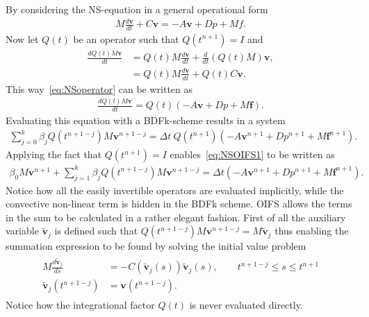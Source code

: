 By considering the NS-equation in a general operational form 
%
\begin{align}
    M\frac{d \mathbf{v}}{dt} + C\mathbf{v} = -A\mathbf{v} +D p +Mf.
    \label{eq:NSoperator}
\end{align}
%
Now let $Q(t)$ be an operator such that $Q(t^{n+1}) = I$ and 
%
\begin{align}
    \frac{dQ(t)M\mathbf{v}}{dt} &=  Q(t)M\frac{d\mathbf{v}}{dt} + \frac{d}{dt}(Q(t)M)\mathbf{v},\\
    &= Q(t)M\frac{d\mathbf{v}}{dt} + Q(t)C\mathbf{v}. 
    \label{eq:integrationalfactor}
\end{align}
%
This way~\ref{eq:NSoperator} can be written as 
\begin{align}
    \frac{d Q(t)M\mathbf{v}}{dt} =Q(t)( -A\mathbf{v} +D p +M\mathbf{f}).
    \label{eq:NSoperatorOIFS}
\end{align}
Evaluating this equation with a BDFk-scheme results in a system 
\begin{align}
    \sum_{j=0}^{k}\beta_jQ(t^{n+1-j})M\mathbf{v}^{n+1-j} =\Delta t \: Q(t^{n+1})( -A\mathbf{v}^{n+1} +D p^{n+1} +M\mathbf{f}^{n+1}).
    \label{eq:NSOIFS1}
\end{align}
Applying the fact that $Q(t^{n+1}) = I$ enables~\ref{eq:NSOIFS1} to be written as 
\begin{align}
    \beta_0M\mathbf{v}^{n+1} + \sum_{j=1}^{k}\beta_jQ(t^{n+1-j})M\mathbf{v}^{n+1-j} 
    =\Delta t ( -A\mathbf{v}^{n+1} +D p^{n+1} +M\mathbf{f}^{n+1}).
    \label{eq:NSOIFS1}
\end{align}
Notice how all the easily invertible operators are evaluated implicitly, while the convective non-linear term is hidden in the BDFk scheme. 
OIFS allows the terms in the sum to be calculated in a rather elegant fashion.
First of all the auxiliary variable $\tilde{\mathbf{v}}_j$ is defined such that $Q(t^{n+1-j})M\mathbf{v}^{n+1-j} = M\tilde{\mathbf{v}}_j$
thus enabling the summation expression to be found by solving the initial value problem 
\begin{align}
    \begin{split}
    M\frac{d\tilde{\mathbf{v}}_j}{ds} &= -C(\tilde{\mathbf{v}}_j(s))\tilde{\mathbf{v}}_j(s) , \qquad t^{n+1-j}\leq s\leq t^{n+1}\\
    \tilde{\mathbf{v}}_j(t^{n+1-j}) &= \mathbf{v}(t^{n+1-j}).
    \end{split}
    \label{eq:IVP}
\end{align}
Notice how the integrational factor $Q(t)$ is never evaluated directly.


